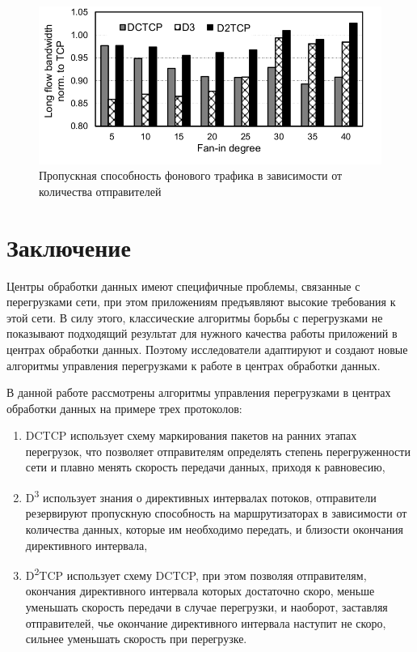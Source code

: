 \documentclass[14pt, a4paper,oneside]{extarticle}
\begin{document}
\begin{figure}
	\includegraphics[width=\linewidth]{d2_back_flows}
	\caption{Пропускная способность фонового трафика в зависимости от количества отправителей}
	\label{d2_back_flows}
\end{figure}
\newpage

\section{Заключение}

Центры обработки данных имеют специфичные проблемы, связанные с перегрузками сети, при этом приложениям предъявляют высокие требования к этой сети. В силу этого, классические алгоритмы борьбы с перегрузками не показывают подходящий результат для нужного качества работы приложений в центрах обработки данных. Поэтому исследователи адаптируют и создают новые алгоритмы управления перегрузками к работе в центрах обработки данных.

В данной работе рассмотрены алгоритмы управления перегрузками в центрах обработки данных на примере трех протоколов:
\begin{enumerate}
\item DCTCP использует схему маркирования пакетов на ранних этапах перегрузок, что позволяет отправителям определять степень перегруженности сети и плавно менять скорость передачи данных, приходя к равновесию,
\item D\textsuperscript{3} использует знания о директивных интервалах потоков, отправители резервируют пропускную способность на маршрутизаторах в зависимости от количества данных, которые им необходимо передать, и близости окончания директивного интервала,
\item D\textsuperscript{2}TCP использует схему DCTCP, при этом позволяя отправителям, окончания директивного интервала которых достаточно скоро, меньше уменьшать скорость передачи в случае перегрузки, и наоборот, заставляя отправителей, чье окончание директивного интервала наступит не скоро, сильнее уменьшать скорость при перегрузке. 
\end{enumerate}
\end{document}
